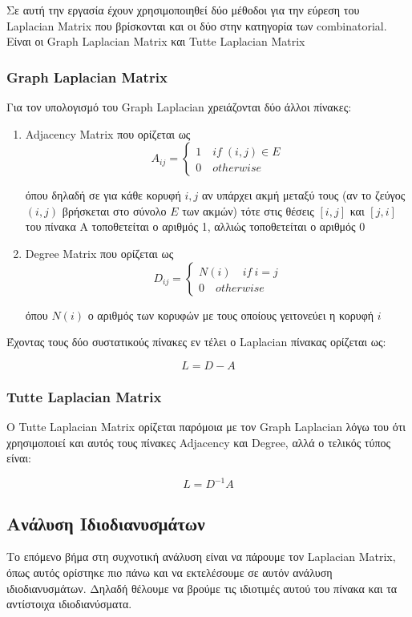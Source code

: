 \documentclass{article}
\begin{document}
Σε αυτή την εργασία έχουν χρησιμοποιηθεί δύο μέθοδοι για την εύρεση του Laplacian Matrix
που βρίσκονται και οι δύο στην κατηγορία των combinatorial.
Είναι οι Graph Laplacian Matrix και Tutte Laplacian Matrix

\subsubsection{Graph Laplacian Matrix}
Για τον υπολογισμό του Graph Laplacian χρειάζονται δύο άλλοι πίνακες:
\begin{enumerate}
	\item Adjacency Matrix που ορίζεται ως
		\[
			A_{ij} = \begin{cases}
				1 \quad if \; (i, j) \in E \\
				0 \quad otherwise
			\end{cases}
		\]

		όπου δηλαδή σε για κάθε κορυφή $i, j$ αν υπάρχει ακμή μεταξύ τους
		(αν το ζεύγος $(i,j)$ βρήσκεται στο σύνολο $E$ των ακμών)
		τότε στις θέσεις $[i, j]$ και $[j, i]$ του πίνακα Α τοποθετείται ο αριθμός 1,
		αλλιώς τοποθετείται ο αριθμός 0

	\item Degree Matrix που ορίζεται ως
		\[
			D_{ij} = \begin{cases}
				N(i) \quad if \ i=j \\
				0 \quad otherwise
			\end{cases}
		\]

		όπου $N(i)$ ο αριθμός των κορυφών με τους οποίους γειτονεύει η κορυφή $i$
\end{enumerate}

\noindent
Έχοντας τους δύο συστατικούς πίνακες εν τέλει ο Laplacian πίνακας ορίζεται ως:

\[
	L = D - A
\]

\subsubsection{Tutte Laplacian Matrix}
Ο Tutte Laplacian Matrix ορίζεται παρόμοια με τον Graph Laplacian
λόγω του ότι χρησιμοποιεί και αυτός τους πίνακες Adjacency και Degree,
αλλά ο τελικός τύπος είναι:

\[
	L = D^{-1}A
\]

\subsection{Ανάλυση Ιδιοδιανυσμάτων}
Το επόμενο βήμα στη συχνοτική ανάλυση είναι να πάρουμε τον Laplacian Matrix,
όπως αυτός ορίστηκε πιο πάνω και να εκτελέσουμε σε αυτόν ανάλυση ιδιοδιανυσμάτων.
Δηλαδή θέλουμε να βρούμε τις ιδιοτιμές αυτού του πίνακα και τα αντίστοιχα ιδιοδιανύσματα.
\end{document}
